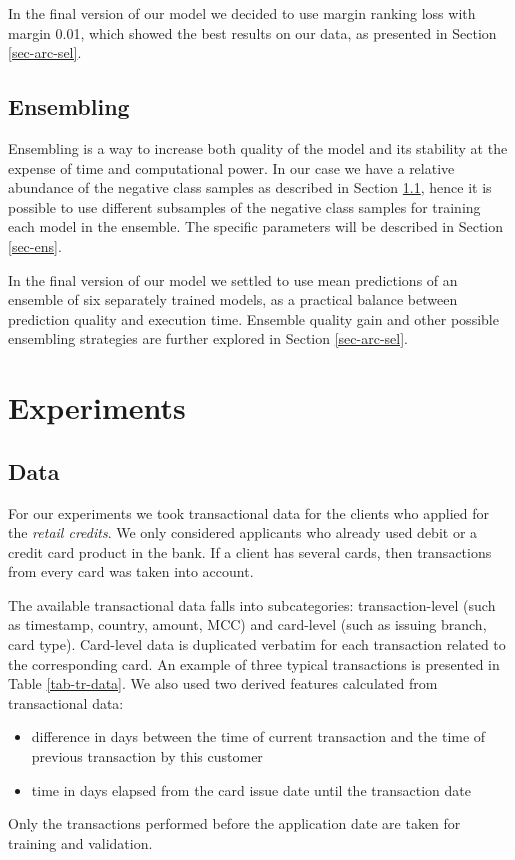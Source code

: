 \documentclass[sigconf]{acmart}
\begin{document}
In the final version of our model we decided to use margin ranking loss with margin 0.01, which showed the best results on our data, as presented in Section \ref{sec-arc-sel}.

\subsection{Ensembling}

Ensembling \cite{breiman1996bagging} is a way to increase both quality of the model and its stability at the expense of time and computational power. In our case we have a relative abundance of the negative class samples as described in Section \ref{sec-data}, hence it is possible to use different subsamples of the negative class samples for training each model in the ensemble. The specific parameters will be described in Section \ref{sec-ens}.

In the final version of our model we settled to use mean predictions of an ensemble of six separately trained models, as a practical balance between prediction quality and execution time. Ensemble quality gain and other possible ensembling strategies are further explored in Section \ref{sec-arc-sel}.

\section{Experiments} \label{sec-exp}
\subsection{Data} \label{sec-data}

For our experiments we took transactional data for the clients who applied for the \textit{retail credits}. We only considered applicants who already used debit or a credit card product in the bank. If a client has several cards, then transactions from every card was taken into account.

The available transactional data falls into subcategories: transaction-level (such as timestamp, country, amount, MCC) and card-level (such as issuing branch, card type). Card-level data is duplicated verbatim for each transaction related to the corresponding card. An example of three typical transactions is presented in Table \ref{tab-tr-data}. 
We also used two derived features calculated from transactional data:
\begin{itemize}
\item difference in days between the time of current transaction and the time of previous transaction by this customer
\item time in days elapsed from the card issue date until the transaction date
\end{itemize}
Only the transactions performed before the application date are taken for training and validation.
\end{document}
